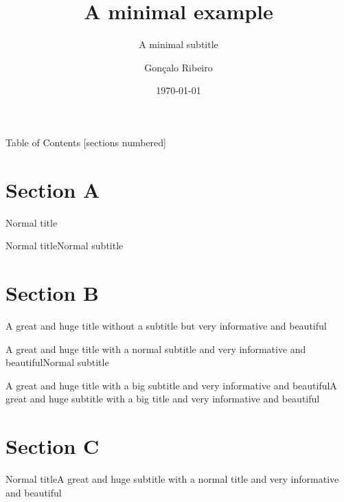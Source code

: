 \documentclass{beamer}
\title{A minimal example}
\subtitle{A minimal subtitle}
\date{\today}
\author{Gonçalo Ribeiro}
\institute{University of Aveiro\\PhD in Mechanical Engineering}
\begin{document}
  \maketitle

\begin{frame}{Table of Contents}
  [sections numbered]
  \tableofcontents
\end{frame}

\section{Section A}
\begin{frame}{Normal title}
\end{frame}
\begin{frame}{Normal title}{Normal subtitle}
\end{frame}
\section{Section B}
\begin{frame}{A great and huge title without a subtitle but very informative and beautiful}
\end{frame}
\begin{frame}{A great and huge title with a normal subtitle and very informative and beautiful}{Normal subtitle}
\end{frame}
\begin{frame}{A great and huge title with a big subtitle and very informative and beautiful}{A great and huge subtitle with a big title and very informative and beautiful}
\end{frame}
\section{Section C}
\begin{frame}{Normal title}{A great and huge subtitle with a normal title and very informative and beautiful}
\end{frame}
\maketitle
\end{document}

